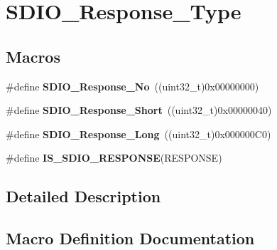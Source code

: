 \hypertarget{group___s_d_i_o___response___type}{}\section{S\+D\+I\+O\+\_\+\+Response\+\_\+\+Type}
\label{group___s_d_i_o___response___type}
\subsection*{Macros}
\begin{DoxyCompactItemize}
\item 
\hypertarget{group___s_d_i_o___response___type_ga308b8ef0e79ba451644dda923bb3ac41}{}\#define {\bfseries S\+D\+I\+O\+\_\+\+Response\+\_\+\+No}~((uint32\+\_\+t)0x00000000)\label{group___s_d_i_o___response___type_ga308b8ef0e79ba451644dda923bb3ac41}

\item 
\hypertarget{group___s_d_i_o___response___type_ga1f61768f90641648fd5c12e8d2f7e508}{}\#define {\bfseries S\+D\+I\+O\+\_\+\+Response\+\_\+\+Short}~((uint32\+\_\+t)0x00000040)\label{group___s_d_i_o___response___type_ga1f61768f90641648fd5c12e8d2f7e508}

\item 
\hypertarget{group___s_d_i_o___response___type_ga1a11a8750612b344214f846784046bb0}{}\#define {\bfseries S\+D\+I\+O\+\_\+\+Response\+\_\+\+Long}~((uint32\+\_\+t)0x000000\+C0)\label{group___s_d_i_o___response___type_ga1a11a8750612b344214f846784046bb0}

\item 
\#define {\bfseries I\+S\+\_\+\+S\+D\+I\+O\+\_\+\+R\+E\+S\+P\+O\+N\+S\+E}(R\+E\+S\+P\+O\+N\+S\+E)
\end{DoxyCompactItemize}


\subsection{Detailed Description}


\subsection{Macro Definition Documentation}
\hypertarget{group___s_d_i_o___response___type_gae4df2359c9b637694b9baa220c16e062}{}
